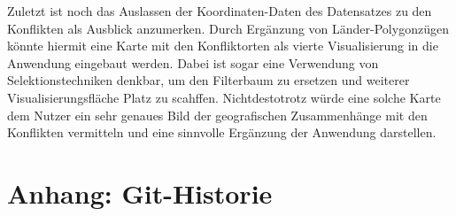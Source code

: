 \documentclass[usegeometry=true]{scrartcl}
\begin{document}
Zuletzt ist noch das Auslassen der Koordinaten-Daten des Datensatzes zu den Konflikten als Ausblick anzumerken. Durch Ergänzung von Länder-Polygonzügen könnte hiermit eine Karte mit den Konfliktorten als vierte Visualisierung in die Anwendung eingebaut werden. Dabei ist sogar eine Verwendung von Selektionstechniken denkbar, um den Filterbaum zu ersetzen und weiterer Visualisierungsfläche Platz zu scahffen. Nichtdestotrotz würde eine solche Karte dem Nutzer ein sehr genaues Bild der geografischen Zusammenhänge mit den Konflikten vermitteln und eine sinnvolle Ergänzung der Anwendung darstellen.\\

\section*{Anhang: Git-Historie}

\printbibliography
\end{document}
